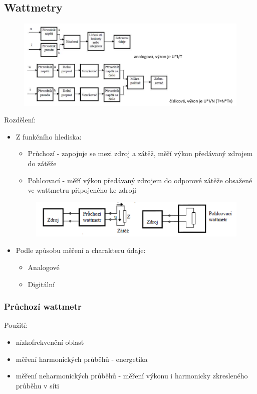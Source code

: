 \subsection*{Wattmetry}
\begin{figure}[H]
    \includegraphics*[scale = 1]{images/wattSchemata.png}
\end{figure}
Rozdělení:
\begin{itemize}
    \item Z funkčního hlediska:
          \begin{itemize}
              \item Průchozí - zapojuje se mezi zdroj a zátěž, měří výkon předávaný zdrojem do zátěže
              \item Pohlcovací - měří výkon předávaný zdrojem do odporové zátěže obsažené ve wattmetru připojeného ke zdroji
          \end{itemize}
          \begin{figure}[H]
              \includegraphics*[scale  = 1]{images/wattTypy.png}
          \end{figure}
    \item Podle způsobu měření a charakteru údaje:
          \begin{itemize}
              \item Analogové
              \item Digitální
          \end{itemize}
\end{itemize}

\subsubsection*{Průchozí wattmetr}
Použití:
\begin{itemize}
    \item nízkofrekvenční oblast
    \item měření harmonických průběhů - energetika
    \item měření neharmonických průběhů - měření výkonu i harmonicky zkresleného průběhu v síti
\end{itemize}


